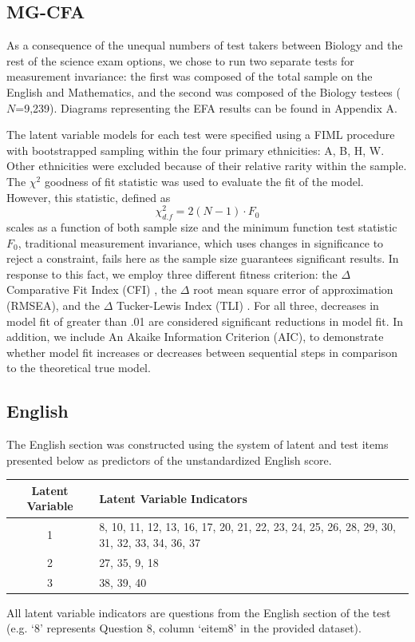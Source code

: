 \documentclass{article}\usepackage[]{graphicx}\usepackage[]{color}
\begin{document}
\subsection{MG-CFA}
As a consequence of the unequal numbers of test takers between Biology and the rest of the science exam options, we chose to run two separate tests for measurement invariance: the first was composed of the total sample on the English and Mathematics, and the second was composed of the Biology testees ($N$=9,239). Diagrams representing the EFA results can be found in Appendix A.

 The latent variable models for each test were specified using a FIML procedure with
bootstrapped sampling within the four primary ethnicities: A, B, H, W.
Other ethnicities were excluded because of their relative rarity within
the sample. The $\chi^{2}$ goodness of fit statistic was used to evaluate the fit of the model. However, this statistic, defined as \begin{equation} \chi^2_{d.f}=2(N-1) \cdot F_0
\end{equation} scales as a function of both sample size and the minimum
function test statistic $F_0$, traditional measurement invariance, which
uses changes in significance to reject a constraint, fails here as the
sample size guarantees significant results. In response to this fact, we
employ three different fitness criterion: the $\Delta$ Comparative Fit
Index (CFI) \cite{Bentler}, the $\Delta$ root mean square error of
approximation (RMSEA), and the $\Delta$ Tucker-Lewis Index (TLI)
\cite{Chen}. For all three, decreases in model fit of greater than .01
are considered significant reductions in model fit. In addition, we
include An Akaike Information Criterion (AIC), to demonstrate whether
model fit increases or decreases between sequential steps in comparison
to the theoretical true model.
\subsection{English}
The English section was constructed using the system of latent and test items presented below as predictors of the unstandardized English score.

\vspace{0.25cm}

\begin{minipage}{\linewidth}
\begin{tabular}{|c|l|}
\multicolumn{1}{c}{Latent Variable} & \multicolumn{1}{l}{Latent Variable Indicators}\tabularnewline
\hline 
1 & 8, 10, 11, 12, 13, 16, 17, 20,  21, 22, 23, 24, 25, 26, 28, 29,  30,
31, 32, 33, 34, 36, 37\tabularnewline
\hline 
2 & 27, 35, 9, 18\tabularnewline
\hline 
3 & 38, 39, 40\tabularnewline
\hline
\end{tabular}

\bigskip

All latent variable indicators are questions from the English section of the test (e.g. `8' represents Question 8, column `eitem8' in the provided dataset).

\end{minipage}
\end{document}

